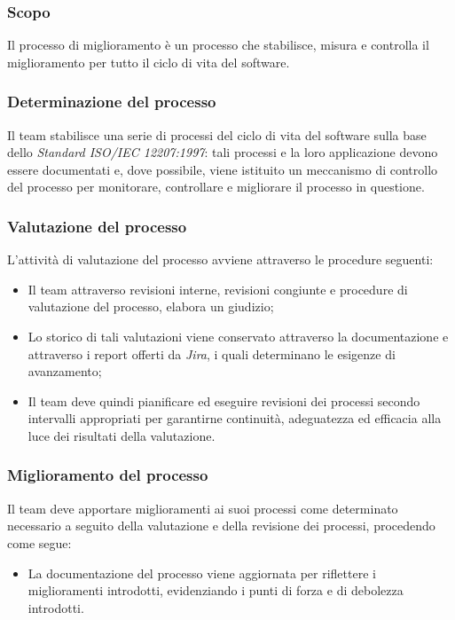 \documentclass[10pt, a4paper]{article}
\begin{document}
\subsubsection{Scopo}
Il processo di miglioramento è un processo che stabilisce, misura e controlla il miglioramento per tutto il ciclo di vita del software. 

\subsubsection{Determinazione del processo}
Il team stabilisce una serie di processi del ciclo di vita del software sulla base dello \textit{Standard ISO/IEC 12207:1997}: tali processi e la loro applicazione devono essere documentati e, 
dove possibile, viene istituito un meccanismo di controllo del processo per monitorare, controllare e migliorare il processo in questione.

\subsubsection{Valutazione del processo}
L'attività di valutazione del processo avviene attraverso le procedure seguenti:
\begin{itemize}
    \item Il team attraverso revisioni interne, revisioni congiunte e procedure di valutazione del processo, elabora un giudizio;
    \item Lo storico di tali valutazioni viene conservato attraverso la documentazione e attraverso i report offerti da \textit{Jira}, i quali determinano le esigenze di avanzamento;
    \item Il team deve quindi pianificare ed eseguire revisioni dei processi secondo intervalli appropriati per garantirne continuità, adeguatezza ed efficacia alla 
    luce dei risultati della valutazione.
\end{itemize}

\subsubsection{Miglioramento del processo}
Il team deve apportare miglioramenti ai suoi processi come determinato necessario a seguito della valutazione e della revisione dei processi, procedendo come segue:
\begin{itemize}
    \item La documentazione del processo viene aggiornata per riflettere i miglioramenti introdotti, evidenziando i punti di forza e di debolezza introdotti.
\end{itemize}
\end{document}

